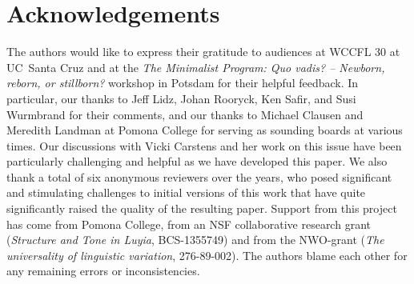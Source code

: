 \documentclass[output=paper
,modfonts
,nonflat
]{langsci/langscibook}
\begin{document}
\section*{Acknowledgements}
The authors would like to express their gratitude to audiences at WCCFL 30 at UC~Santa Cruz and at the \textit{The Minimalist Program: Quo vadis? -- Newborn, reborn, or stillborn?} workshop in Potsdam for their helpful feedback. In particular, our thanks to Jeff Lidz, Johan Rooryck, Ken Safir, and Susi Wurmbrand for their comments, and our thanks to Michael Clausen and Meredith Landman at Pomona College for serving as sounding boards at various times. Our discussions with Vicki Carstens and her work on this issue have been particularly challenging and helpful as we have developed this paper. We also thank a total of six anonymous reviewers over the years, who posed significant and stimulating challenges to initial versions of this work that have quite significantly raised the quality of the resulting paper. Support from this project has come from Pomona College, from an NSF collaborative research grant (\textit{Structure and Tone in Luyia}, BCS-1355749) and from the NWO-grant (\textit{The universality of linguistic variation}, 276-89-002). The authors blame each other for any remaining errors or inconsistencies.


{\sloppy\printbibliography[heading=subbibliography,notkeyword=this]}
\end{document}
